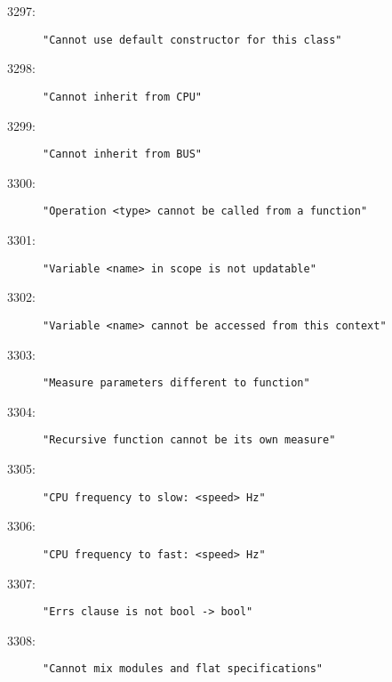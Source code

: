 \begin{description}
\item[3297:] \texttt{"Cannot use default constructor for this class"}
\item[3298:] \texttt{"Cannot inherit from CPU"}
\item[3299:] \texttt{"Cannot inherit from BUS"}
\item[3300:] \texttt{"Operation <type> cannot be called from a function"}
\item[3301:] \texttt{"Variable <name> in scope is not updatable"}
\item[3302:] \texttt{"Variable <name> cannot be accessed from this context"}
\item[3303:] \texttt{"Measure parameters different to function"}
\item[3304:] \texttt{"Recursive function cannot be its own measure"}
\item[3305:] \texttt{"CPU frequency to slow:\ <speed> Hz"}
\item[3306:] \texttt{"CPU frequency to fast:\ <speed> Hz"}
\item[3307:] \texttt{"Errs clause is not bool -> bool"}
\item[3308:] \texttt{"Cannot mix modules and flat specifications"}
\end{description}

